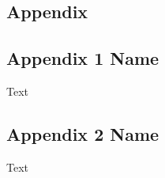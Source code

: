 %
%
\begin{appendix}
\chapter*{Appendix}
\setcounter{chapter}{1}

\section{Appendix 1 Name}
Text

\section{Appendix 2 Name}
Text

\end{appendix}
